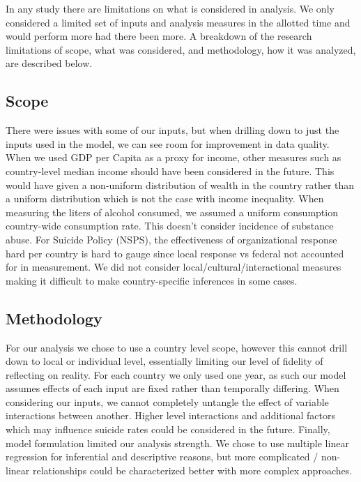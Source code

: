 \documentclass[]{article}
\begin{document}
In any study there are limitations on what is considered in analysis. We
only considered a limited set of inputs and analysis measures in the
allotted time and would perform more had there been more. A breakdown of
the research limitations of scope, what was considered, and methodology,
how it was analyzed, are described below.

\subsection{Scope}\label{scope}

There were issues with some of our inputs, but when drilling down to
just the inputs used in the model, we can see room for improvement in
data quality. When we used GDP per Capita as a proxy for income, other
measures such as country-level median income should have been considered
in the future. This would have given a non-uniform distribution of
wealth in the country rather than a uniform distribution which is not
the case with income inequality. When measuring the liters of alcohol
consumed, we assumed a uniform consumption country-wide consumption
rate. This doesn't consider incidence of substance abuse. For Suicide
Policy (NSPS), the effectiveness of organizational response hard per
country is hard to gauge since local response vs federal not accounted
for in measurement. We did not consider local/cultural/interactional
measures making it difficult to make country-specific inferences in some
cases.

\subsection{Methodology}\label{methodology}

For our analysis we chose to use a country level scope, however this
cannot drill down to local or individual level, essentially limiting our
level of fidelity of reflecting on reality. For each country we only
used one year, as such our model assumes effects of each input are fixed
rather than temporally differing. When considering our inputs, we cannot
completely untangle the effect of variable interactions between another.
Higher level interactions and additional factors which may influence
suicide rates could be considered in the future. Finally, model
formulation limited our analysis strength. We chose to use multiple
linear regression for inferential and descriptive reasons, but more
complicated / non-linear relationships could be characterized better
with more complex approaches.
\end{document}
